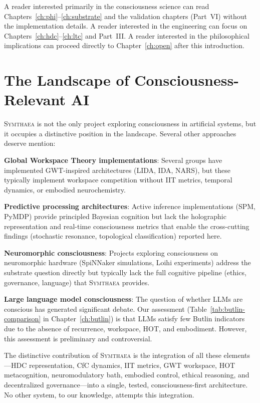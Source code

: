 \documentclass[12pt]{book}
\newcommand{\symthaea}{\textsc{Symthaea}}
\begin{document}
A reader interested primarily in the consciousness science can read Chapters~\ref{ch:phi}--\ref{ch:substrate} and the validation chapters (Part~VI) without the implementation details. A reader interested in the engineering can focus on Chapters~\ref{ch:hdc}--\ref{ch:ltc} and Part~III. A reader interested in the philosophical implications can proceed directly to Chapter~\ref{ch:open} after this introduction.

\section{The Landscape of Consciousness-Relevant AI}

\symthaea{} is not the only project exploring consciousness in artificial systems, but it occupies a distinctive position in the landscape. Several other approaches deserve mention:

\textbf{Global Workspace Theory implementations}: Several groups have implemented GWT-inspired architectures (LIDA, IDA, NARS), but these typically implement workspace competition without IIT metrics, temporal dynamics, or embodied neurochemistry.

\textbf{Predictive processing architectures}: Active inference implementations (SPM, PyMDP) provide principled Bayesian cognition but lack the holographic representation and real-time consciousness metrics that enable the cross-cutting findings (stochastic resonance, topological classification) reported here.

\textbf{Neuromorphic consciousness}: Projects exploring consciousness on neuromorphic hardware (SpiNNaker simulations, Loihi experiments) address the substrate question directly but typically lack the full cognitive pipeline (ethics, governance, language) that \symthaea{} provides.

\textbf{Large language model consciousness}: The question of whether LLMs are conscious has generated significant debate. Our assessment (Table~\ref{tab:butlin-comparison} in Chapter~\ref{ch:butlin}) is that LLMs satisfy few Butlin indicators due to the absence of recurrence, workspace, HOT, and embodiment. However, this assessment is preliminary and controversial.

The distinctive contribution of \symthaea{} is the integration of all these elements---HDC representation, CfC dynamics, IIT metrics, GWT workspace, HOT metacognition, neuromodulatory bath, embodied control, ethical reasoning, and decentralized governance---into a single, tested, consciousness-first architecture. No other system, to our knowledge, attempts this integration.
\end{document}
